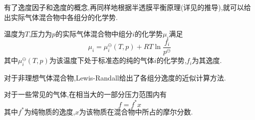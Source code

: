 \documentclass{ctexart}
\begin{document}
有了逸度因子和逸度的概念,再同样地根据半透膜平衡原理(详见的推导),就可以给出实际气体混合物中各组分的化学势.
\begin{theorem}[4B.4.2 实际气体混合物中各组分的化学势]
    温度为$T$,压力为$p$的实际气体混合物中组分$i$的化学势$\mu_i$满足
    \[\mu_i=\mu_i^{\ominus}(T,p)+RT\ln\dfrac{f_i}{p^\ominus}\]
    其中$\mu_i^{\ominus}(T,p)$为该温度下处于标准态的纯的气体$i$的化学势,$f_i$为其逸度.
\end{theorem}
对于非理想气体混合物,Lewis-Randall给出了各组分逸度的近似计算方法.
\begin{theorem}[4B.4.3 实际气体混合物中各组分逸度的近似计算]
    对于一些常见的气体,在相当大的一部分压力范围内有
    \[f=f^\ast x\]
    其中$f^\ast$为纯物质的逸度,$x$为该物质在混合物中所占的摩尔分数.
\end{theorem}
\end{document}
